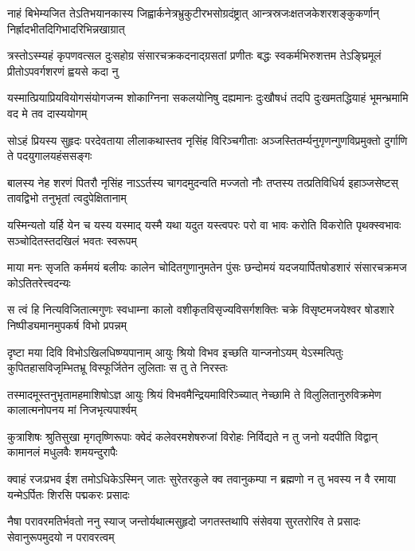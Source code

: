 \fourlineindentedshloka
{नाहं बिभेम्यजित तेऽतिभयानकास्य}
{जिह्वार्कनेत्रभ्रुकुटीरभसोग्रदंष्ट्रात्}
{आन्त्रस्रजःक्षतजकेशरशङ्कुकर्णान्}
{निर्ह्रादभीतदिगिभादरिभिन्नखाग्रात्} %

\fourlineindentedshloka
{त्रस्तोऽस्म्यहं कृपणवत्सल दुःसहोग्र}
{संसारचक्रकदनाद्ग्रसतां प्रणीतः}
{बद्धः स्वकर्मभिरुशत्तम तेऽङ्घ्रिमूलं}
{प्रीतोऽपवर्गशरणं ह्वयसे कदा नु} %

\fourlineindentedshloka
{यस्मात्प्रियाप्रियवियोगसंयोगजन्म}
{शोकाग्निना सकलयोनिषु दह्यमानः}
{दुःखौषधं तदपि दुःखमतद्धियाहं}
{भूमन्भ्रमामि वद मे तव दास्ययोगम्} %

\fourlineindentedshloka
{सोऽहं प्रियस्य सुहृदः परदेवताया}
{लीलाकथास्तव नृसिंह विरिञ्चगीताः}
{अञ्जस्तितर्म्यनुगृणन्गुणविप्रमुक्तो}
{दुर्गाणि ते पदयुगालयहंससङ्गः} %

\fourlineindentedshloka
{बालस्य नेह शरणं पितरौ नृसिंह}
{नाऽऽर्तस्य चागदमुदन्वति मज्जतो नौः}
{तप्तस्य तत्प्रतिविधिर्य इहाञ्जसेष्टस्}
{तावद्विभो तनुभृतां त्वदुपेक्षितानाम्} %

\fourlineindentedshloka
{यस्मिन्यतो यर्हि येन च यस्य यस्माद्}
{यस्मै यथा यदुत यस्त्वपरः परो वा}
{भावः करोति विकरोति पृथक्स्वभावः}
{सञ्चोदितस्तदखिलं भवतः स्वरूपम्} %

\fourlineindentedshloka
{माया मनः सृजति कर्ममयं बलीयः}
{कालेन चोदितगुणानुमतेन पुंसः}
{छन्दोमयं यदजयार्पितषोडशारं}
{संसारचक्रमज कोऽतितरेत्त्वदन्यः} %

\fourlineindentedshloka
{स त्वं हि नित्यविजितात्मगुणः स्वधाम्ना}
{कालो वशीकृतविसृज्यविसर्गशक्तिः}
{चक्रे विसृष्टमजयेश्वर षोडशारे}
{निष्पीड्यमानमुपकर्ष विभो प्रपन्नम्} %

\fourlineindentedshloka
{दृष्टा मया दिवि विभोऽखिलधिष्ण्यपानाम्}
{आयुः श्रियो विभव इच्छति यान्जनोऽयम्}
{येऽस्मत्पितुः कुपितहासविजृम्भितभ्रू}
{विस्फूर्जितेन लुलिताः स तु ते निरस्तः} %

\fourlineindentedshloka
{तस्मादमूस्तनुभृतामहमाशिषोऽज्ञ}
{आयुः श्रियं विभवमैन्द्रियमाविरिञ्च्यात्}
{नेच्छामि ते विलुलितानुरुविक्रमेण}
{कालात्मनोपनय मां निजभृत्यपार्श्वम्} %

\fourlineindentedshloka
{कुत्राशिषः श्रुतिसुखा मृगतृष्णिरूपाः}
{क्वेदं कलेवरमशेषरुजां विरोहः}
{निर्विद्यते न तु जनो यदपीति विद्वान्}
{कामानलं मधुलवैः शमयन्दुरापैः} %

\fourlineindentedshloka
{क्वाहं रजःप्रभव ईश तमोऽधिकेऽस्मिन्}
{जातः सुरेतरकुले क्व तवानुकम्पा}
{न ब्रह्मणो न तु भवस्य न वै रमाया}
{यन्मेऽर्पितः शिरसि पद्मकरः प्रसादः} %

\fourlineindentedshloka
{नैषा परावरमतिर्भवतो ननु स्याज्}
{जन्तोर्यथात्मसुहृदो जगतस्तथापि}
{संसेवया सुरतरोरिव ते प्रसादः}
{सेवानुरूपमुदयो न परावरत्वम्} %

